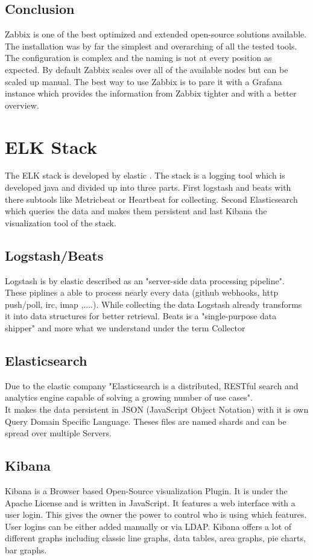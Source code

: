 \subsection{Conclusion}
Zabbix is one of the best optimized and extended open-source solutions available. The installation was by far the simplest and overarching of all the tested tools. The configuration is complex and the naming is not at every position as expected. By default Zabbix scales over all of the available nodes but can be scaled up manual. The best way to use Zabbix is to pare it with a Grafana instance which provides the information from Zabbix tighter and with a better overview.

\section{ELK Stack }
\label{elk} %
The ELK stack is developed by elastic \cite{elasticsearch}. 
The stack is a logging tool which is developed java and divided up into three parts. First  logstash and beats with there subtools like Metricbeat or Heartbeat for collecting. Second Elasticsearch which queries the data and makes them persistent and last Kibana the visualization tool of the stack.
\subsection{Logstash/Beats}
Logstash is by elastic described as an 
"server-side data processing pipeline"\cite{elasticsearch}. These piplines a able to process nearly every data (github webhooks, http push/poll, irc, imap ,....).
While collecting the data Logstash already transforms it into data structures for better retrieval.
Beats is a "single-purpose data shipper"\cite{elasticsearch} and more what we understand under the term Collector
\subsection{Elasticsearch}
\label{Elasticsearch}
Due to the elastic company "Elasticsearch is a distributed, RESTful search and analytics engine capable of solving a growing number of use cases"\cite{elasticsearch}.\\ It makes the data persistent in JSON (JavaScript Object Notation) with it is own Query Domain Specific Language. Theses files are named shards and can be spread over multiple Servers.
\subsection{Kibana}
Kibana is a Browser based Open-Source visualization Plugin. It is under the Apache License and is written in JavaScript. It features a web interface with a user login. This gives the owner the power to control who is using which features. User logins can be either added manually or via LDAP.
Kibana offers a lot of different graphs including classic line graphs, data tables, area graphs, pie charts, bar graphs.
